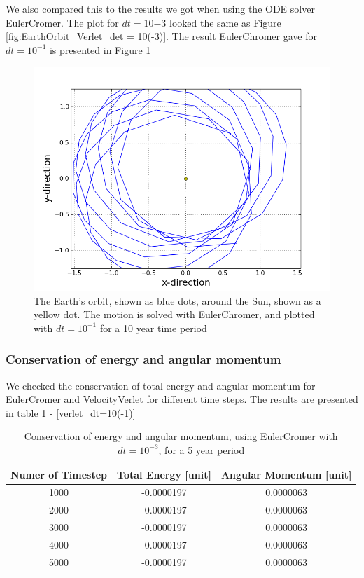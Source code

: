 \documentclass[norsk,a4paper,12pt]{article}
\begin{document}
{We also compared this to the results we got when using the ODE solver EulerCromer. The plot for $dt=10{-3}$ looked the same as Figure \ref{fig:EarthOrbit_Verlet_det = 10(-3)}. The result EulerChromer gave for $dt=10^{-1}$ is presented in Figure \ref{fig:oppg_3c_sun_earth_euler_dt=10(-1)}

\begin{figure} [H]
    \centering
    \includegraphics[scale=0.6]{oppg_3c_sun_earth_euler_dt=10(-1)}
    \caption{The Earth's orbit, shown as blue dots, around the Sun, shown as a yellow dot. The motion is solved with EulerChromer, and plotted with $dt = 10^{-1}$ for a 10 year time period}
    \label{fig:oppg_3c_sun_earth_euler_dt=10(-1)}
\end{figure}

\subsubsection{Conservation of energy and angular momentum}
We checked the conservation of total energy and angular momentum for EulerCromer and VelocityVerlet for different time steps. The results are presented in table \ref{euler_dt=10(-3)} - \ref{verlet_dt=10(-1)}
\par
\vspace{3mm}

\begin{table} [H]
\caption{Conservation of energy and angular momentum, using EulerCromer with $dt=10^{-3}$, for a 5 year period}
\begin{tabular}{|c|c|c|} \hline
    {\bf Numer of Timestep} & {\bf Total Energy [unit]}& {\bf Angular Momentum [unit]}\\ \hline
    1000 & -0.0000197 & 0.0000063\\ \hline
    2000 & -0.0000197 & 0.0000063\\ \hline
    3000 & -0.0000197 & 0.0000063\\ \hline
    4000 & -0.0000197 & 0.0000063\\ \hline
    5000 & -0.0000197 & 0.0000063\\ \hline 
\end{tabular}
\label{euler_dt=10(-3)}
\end{table}

}
\end{document}
